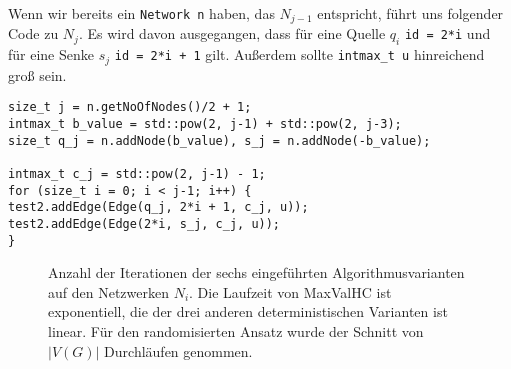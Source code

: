 Wenn wir bereits ein \lstinline|Network n| haben, das $N_{j-1}$ entspricht, führt uns folgender Code zu $N_{j}$. Es wird davon ausgegangen, dass für eine Quelle $q_i$ \lstinline|id = 2*i| und für eine Senke $s_j$ \lstinline|id = 2*i + 1| gilt. Außerdem sollte \lstinline|intmax_t u| hinreichend groß sein.

\begin{lstlisting}
size_t j = n.getNoOfNodes()/2 + 1;
intmax_t b_value = std::pow(2, j-1) + std::pow(2, j-3);
size_t q_j = n.addNode(b_value), s_j = n.addNode(-b_value);

intmax_t c_j = std::pow(2, j-1) - 1;
for (size_t i = 0; i < j-1; i++) {
test2.addEdge(Edge(q_j, 2*i + 1, c_j, u));
test2.addEdge(Edge(2*i, s_j, c_j, u));
}
\end{lstlisting}

\begin{figure}[!ht]\centering
    
    \caption{Anzahl der Iterationen der sechs eingeführten Algorithmusvarianten auf den Netzwerken $N_i$. Die Laufzeit von MaxValHC ist exponentiell, die der drei anderen deterministischen Varianten ist linear. Für den randomisierten Ansatz wurde der Schnitt von $|V(G)|$ Durchläufen genommen.}
    \label{fig:plot_exp}
\end{figure}
